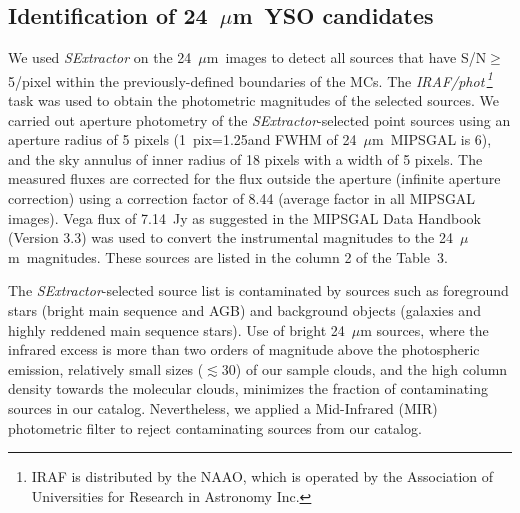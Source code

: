\documentclass[iop]{emulateapj}
\newcommand{\mipslam}{24~$\mu$m}
\begin{document}
\subsection{Identification of \mipslam ~YSO candidates}

We used {\it SExtractor} \citep{bertin+96} on the \mipslam ~images
to detect all sources
that have S/N$\ge$5/pixel within the previously-defined boundaries of the MCs.
The {\it IRAF/phot{\,\footnote{IRAF is distributed by the NAAO, which
is operated by the Association of Universities for Research in
Astronomy Inc.}}} task was used to obtain the photometric magnitudes
of the selected sources. We carried out aperture photometry of the 
{\it SExtractor}-selected point sources using an aperture radius of 5 pixels 
(1~pix=1.25\arcsec and FWHM of \mipslam~MIPSGAL is 
6\arcsec), and the sky annulus of inner radius of 18 pixels 
with a width of 5 pixels. The measured fluxes are corrected for the flux 
outside the aperture
(infinite aperture correction) using a correction factor of 8.44 (average factor
in all MIPSGAL images). Vega flux of 7.14~Jy as suggested in the MIPSGAL 
Data Handbook (Version 3.3) was used to convert the instrumental magnitudes 
to the \mipslam ~magnitudes. 
These sources are listed in the column 2 of the Table~3.

The {\it SExtractor}-selected source list is contaminated by
sources such as foreground stars (bright main sequence and AGB) and 
background objects (galaxies and highly reddened main sequence stars).
Use of bright 24~$\mu$m sources, where the infrared excess is more than
two orders of magnitude above the photospheric emission,
relatively small sizes ($\lesssim$30\arcmin) of our sample clouds, 
and the high column density towards
the molecular clouds, minimizes the fraction of contaminating
sources in our catalog. Nevertheless, we
applied a Mid-Infrared (MIR) photometric filter to reject contaminating
sources from our catalog. 
\end{document}
